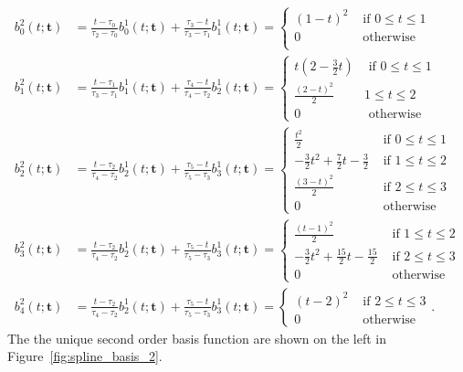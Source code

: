 \documentclass{article}
\begin{document}
\begin{align*}
b_0^2(t; \mathbf{t}) &= \frac{t-\tau_0}{\tau_2-\tau_0} b_0^1(t;\mathbf{t}) + \frac{\tau_3-t}{\tau_3-\tau_1}b_1^1(t; \mathbf{t}) 
	= \begin{cases} (1-t)^2   & \text{~if~} 0 \leq t \leq 1 \\
				    0 & \text{~otherwise~}  \\ 
 	  \end{cases}
\\ 
b_1^2(t; \mathbf{t}) &= \frac{t-\tau_1}{\tau_3-\tau_1} b_1^1(t;\mathbf{t}) + \frac{\tau_4-t}{\tau_4-\tau_2}b_2^1(t; \mathbf{t})
	= \begin{cases} t(2-\frac{3}{2}t) & \text{~if~} 0 \leq t \leq 1 \\ 
 									\frac{(2-t)^2}{2} & 1 \leq t \leq 2 \\
 									0 & \text{~otherwise}
 					    \end{cases}
\\ 
b_2^2(t; \mathbf{t}) &= \frac{t-\tau_2}{\tau_4-\tau_2} b_2^1(t;\mathbf{t}) + \frac{\tau_5-t}{\tau_5-\tau_3}b_3^1(t; \mathbf{t})
	= \begin{cases} \frac{t^2}{2} & \text{~if~} 0 \leq t \leq 1 \\ 
 					-\frac{3}{2}t^2 + \frac{7}{2}t - \frac{3}{2} & \text{~if~} 1 \leq t \leq 2 \\
 					\frac{(3-t)^2}{2} & \text{~if~} 2 \leq t \leq 3 \\
 					0 & \text{~otherwise}
 	  \end{cases}
\\ 
b_3^2(t; \mathbf{t}) &= \frac{t-\tau_2}{\tau_4-\tau_2} b_2^1(t;\mathbf{t}) + \frac{\tau_5-t}{\tau_5-\tau_3}b_3^1(t; \mathbf{t})
	= \begin{cases} \frac{(t-1)^2}{2} & \text{~if~} 1 \leq t \leq 2 \\ 
 					-\frac{3}{2}t^2 + \frac{15}{2}t-\frac{15}{2} & \text{~if~} 2 \leq t \leq 3 \\
 					0 & \text{~otherwise}
 	  \end{cases}
\\ 
b_4^2(t; \mathbf{t}) &= \frac{t-\tau_2}{\tau_4-\tau_2} b_2^1(t;\mathbf{t}) + \frac{\tau_5-t}{\tau_5-\tau_3}b_3^1(t; \mathbf{t})
	= \begin{cases} (t-2)^2 & \text{~if~} 2 \leq t \leq 3 \\ 
 					0 & \text{~otherwise}
 	  \end{cases}.	   	  
\end{align*}
The the unique second order basis function are shown on the left in Figure~\ref{fig:spline_basis_2}.
\end{document}
